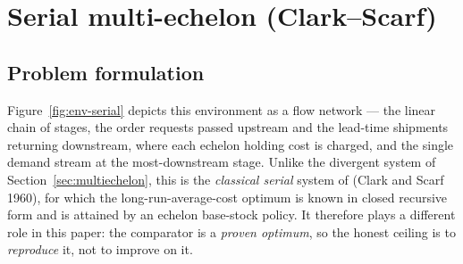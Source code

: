 %
%
%

\section{Serial multi-echelon (Clark--Scarf)}
\label{sec:serial}

\subsection{Problem formulation}

Figure~\ref{fig:env-serial} depicts this environment as a flow network --- the linear chain of stages,
the order requests passed upstream and the lead-time shipments returning downstream, where each
echelon holding cost is charged, and the single demand stream at the most-downstream stage. Unlike the
divergent system of Section~\ref{sec:multiechelon}, this is the \emph{classical serial} system of
\citet{snyder2019foundations} (Clark and Scarf 1960), for which the long-run-average-cost optimum is
known in closed recursive form and is attained by an echelon base-stock policy. It therefore plays a
different role in this paper: the comparator is a \emph{proven optimum}, so the honest ceiling is to
\emph{reproduce} it, not to improve on it.

